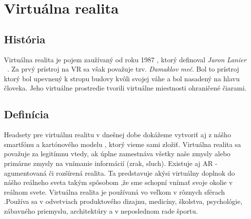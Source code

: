 \documentclass[10pt,twoside,slovak,a4paper]{article}										%
\begin{document}
\section{Virtuálna realita}	\label{VR}
\subsection{História} \label{VR:hist}		
Virtuálna realita je pojem zaužívaný od roku 1987 , ktorý definoval \emph{Jaron Lanier} ~\cite{Jaron:zdroj}. Za prvý prístroj na VR sa však považuje tzv. \emph{Damaklov meč}. Bol to prístroj ktorý bol upevnený k stropu budovy kvôli svojej váhe a bol nasadený na hlavu človeka. Jeho virtuálne prostredie tvorili virtuálne miestnosti ohraničené čiarami.

\subsection {Definícia} \label{VR:now}
 Headsety pre virtuálnu realitu v dnešnej dobe dokážeme vytvoriť aj z nášho smartfónu a kartónového modelu , ktorý vieme sami zložiť. Virtuálna realita sa považuje za legitímnu vtedy, ak úplne zamestnáva všetky naše zmysly alebo primárne zmysly na vnímanie informácií (zrak, sluch). Existuje aj AR - agumentovaná či rozšírená realita. Ta predstavuje akýsi virtuálny doplnok do nášho reálneho sveta takým spôsobom ,že sme schopní vnímať svoje okolie v reálnom svete. Virtuálna realita je používaná vo veľkom v rôznych sférach .Používa sa v odvetviach produktového dizajnu, medicíny, školstva, psychológie, zábavného priemyslu, architektúry a v neposlednom rade športu.~\cite{zhrnutie:zdroj}
\end{document}

